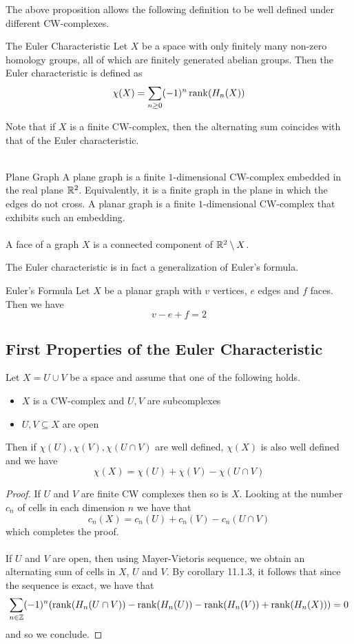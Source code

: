 \documentclass[a4paper]{article}
\begin{document}
The above proposition allows the following definition to be well defined under different CW-complexes. 

\begin{defn}{The Euler Characteristic}{} Let $X$ be a space with only finitely many non-zero homology groups, all of which are finitely generated abelian groups. Then the Euler characteristic is defined as $$\chi(X)=\sum_{n\geq 0}(-1)^n\rank(H_n(X))$$
\end{defn}

Note that if $X$ is a finite CW-complex, then the alternating sum coincides with that of the Euler characteristic. \\~\\

\begin{defn}{Plane Graph}{} A plane graph is a finite $1$-dimensional CW-complex embedded in the real plane $\mathbb{R}^2$. Equivalently, it is a finite graph in the plane in which the edges do not cross. A planar graph is a finite $1$-dimensional CW-complex that exhibits such an embedding. \\~\\

A face of a graph $X$ is a connected component of $\mathbb{R}^2\setminus X$. 
\end{defn}

The Euler characteristic is in fact a generalization of Euler's formula. 

\begin{prp}{Euler's Formula}{} Let $X$ be a planar graph with $v$ vertices, $e$ edges and $f$ faces. Then we have $$v-e+f=2$$
\end{prp}

\subsection{First Properties of the Euler Characteristic}
\begin{prp}{}{} Let $X=U\cup V$ be a space and assume that one of the following holds. 
\begin{itemize}
\item $X$ is a CW-complex and $U,V$ are subcomplexes
\item $U,V\subseteq X$ are open
\end{itemize}
Then if $\chi(U),\chi(V),\chi(U\cap V)$ are well defined, $\chi(X)$ is also well defined and we have $$\chi(X)=\chi(U)+\chi(V)-\chi(U\cap V)$$ \tcbline
\begin{proof}
If $U$ and $V$ are finite CW complexes then so is $X$. Looking at the number $c_n$ of cells in each dimension $n$ we have that $$c_n(X)=c_n(U)+c_n(V)-c_n(U\cap V)$$ which completes the proof. \\~\\

If $U$ and $V$ are open, then using Mayer-Vietoris sequence, we obtain an alternating sum of cells in $X$, $U$ and $V$. By corollary 11.1.3, it follows that since the sequence is exact, we have that $$\sum_{n\in\mathbb{Z}}(-1)^n(\rank(H_n(U\cap V))-\rank(H_n(U))-\rank(H_n(V))+\rank(H_n(X)))=0$$ and so we conclude. 
\end{proof}
\end{prp}
\end{document}
